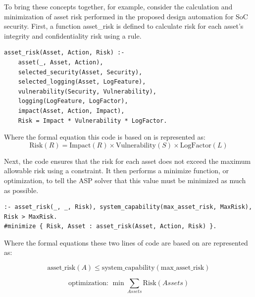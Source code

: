 To bring these concepts together, for example, consider the calculation and minimization of asset risk performed in the proposed design automation for SoC security. First, a function asset\_risk is defined to calculate risk for each asset's integrity and confidentiality risk using a rule.


\begin{verbatim}
asset_risk(Asset, Action, Risk) :-
    asset(_, Asset, Action),
    selected_security(Asset, Security),
    selected_logging(Asset, LogFeature),
    vulnerability(Security, Vulnerability),
    logging(LogFeature, LogFactor),
    impact(Asset, Action, Impact),
    Risk = Impact * Vulnerability * LogFactor.
\end{verbatim}

Where the formal equation this code is based on is represented as:
\begin{equation}
\label{eq:Risk}
\text{Risk}(R) =\text{Impact}(R) \times \text{Vulnerability}(S) \times \text{LogFactor}(L)
\end{equation}

Next, the code ensures that the risk for each asset does not exceed the maximum allowable risk using a constraint. It then performs a minimize function, or optimization, to tell the ASP solver that this value must be minimized as much as possible.


\begin{verbatim}
:- asset_risk(_, _, Risk), system_capability(max_asset_risk, MaxRisk), Risk > MaxRisk.
#minimize { Risk, Asset : asset_risk(Asset, Action, Risk) }.
\end{verbatim}
Where the formal equations these two lines of code are based on are represented as:

\begin{equation}
\label{eq:EnsureLessThanMaxRisk}
\text{asset\_risk}(A) \leq \text{system\_capability}(\text{max\_asset\_risk})
\end{equation}

\begin{equation}
\label{eq:minimizeRisk}
\text{optimization: } \min \sum_{Assets} \text{Risk}(Assets)
\end{equation}

